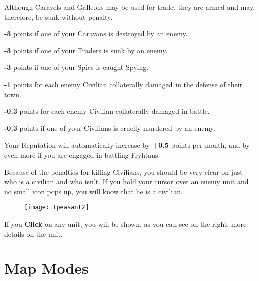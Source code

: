 {%

\begin{changemargin}{1cm}{0cm}
Although Caravels and Galleons may be used for trade, they are armed and may, therefore, be sunk without penalty.
\end{changemargin}

\begin{changemargin}{.5cm}{0cm}
\textbf{-3} points if one of your Caravans is destroyed by an enemy.

\textbf{-3} points if one of your Traders is sunk by an enemy.

\textbf{-3} points if one of your Spies is caught Spying.

\textbf{-1} points for each enemy Civilian collaterally damaged in the defense of their town.

\textbf{-0.3} points for each enemy Civilian collaterally damaged in battle.

\textbf{-0.3} points if one of your Civilians is cruelly murdered by an enemy.

Your Reputation will automatically increase by \textbf{+0.5} points per month, and by even more if you are engaged in battling Fryhtans.
\end{changemargin}


Because of the penalties for killing Civilians, you should be very clear on just who is a civilian and who isn’t. If you hold your cursor over an enemy unit and no small icon pops up, you will know that he is a civilian.

\begin{wrapfigure}{r}{0.4\textwidth}
\vspace{-20pt}
    \begin{center}
        \texttt{[image: Ipeasant2]} %
\end{center}
\vspace{-20pt}
\end{wrapfigure}

If you \textbf{Click} on any unit, you will be shown, as you can see on the right, more details on the unit. \\

\section{\textsf{Map Modes}}


}
